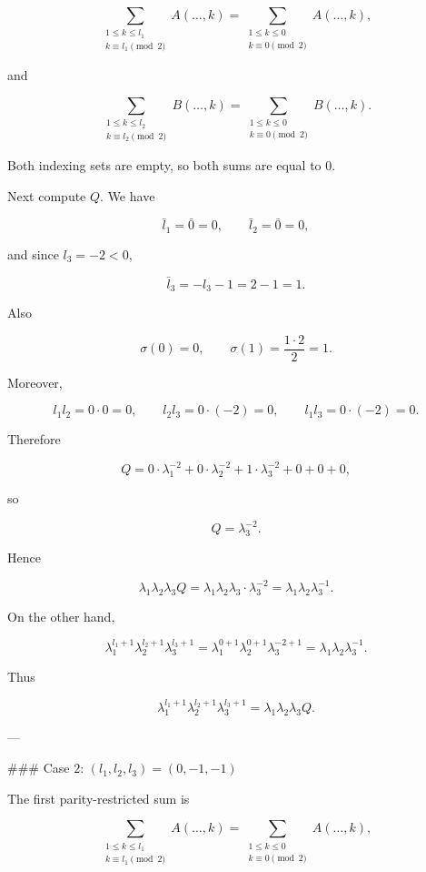 \[
\sum_{\substack{1\le k\le l_1\\ k\equiv l_1\pmod 2}} A(\ldots,k)
=
\sum_{\substack{1\le k\le 0\\ k\equiv 0\pmod 2}} A(\ldots,k),
\]

and

\[
\sum_{\substack{1\le k\le l_2\\ k\equiv l_2\pmod 2}} B(\ldots,k)
=
\sum_{\substack{1\le k\le 0\\ k\equiv 0\pmod 2}} B(\ldots,k).
\]

Both indexing sets are empty, so both sums are equal to $0$.

Next compute $Q$. We have

\[
\bar l_1=\bar 0=0,\qquad \bar l_2=\bar 0=0,
\]

and since $l_3=-2<0$,

\[
\bar l_3=-l_3-1=2-1=1.
\]

Also

\[
\sigma(0)=0,\qquad \sigma(1)=\frac{1\cdot 2}{2}=1.
\]

Moreover,

\[
l_1l_2=0\cdot 0=0,\qquad
l_2l_3=0\cdot (-2)=0,\qquad
l_1l_3=0\cdot (-2)=0.
\]

Therefore

\[
Q
=
0\cdot \lambda_1^{-2}
+
0\cdot \lambda_2^{-2}
+
1\cdot \lambda_3^{-2}
+
0
+
0
+
0,
\]

so

\[
Q=\lambda_3^{-2}.
\]

Hence

\[
\lambda_1\lambda_2\lambda_3 Q
=
\lambda_1\lambda_2\lambda_3\cdot \lambda_3^{-2}
=
\lambda_1\lambda_2\lambda_3^{-1}.
\]

On the other hand,

\[
\lambda_1^{l_1+1}\lambda_2^{l_2+1}\lambda_3^{l_3+1}
=
\lambda_1^{0+1}\lambda_2^{0+1}\lambda_3^{-2+1}
=
\lambda_1\lambda_2\lambda_3^{-1}.
\]

Thus

\[
\lambda_1^{l_1+1}\lambda_2^{l_2+1}\lambda_3^{l_3+1}
=
\lambda_1\lambda_2\lambda_3 Q.
\]

---

### Case $2$: \((l_1,l_2,l_3)=(0,-1,-1)\)

The first parity-restricted sum is

\[
\sum_{\substack{1\le k\le l_1\\ k\equiv l_1\pmod 2}} A(\ldots,k)
=
\sum_{\substack{1\le k\le 0\\ k\equiv 0\pmod 2}} A(\ldots,k),
\]

